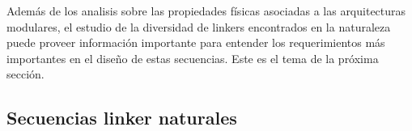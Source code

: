 Además de los analisis sobre las propiedades físicas asociadas a las arquitecturas modulares, el estudio de la diversidad de linkers encontrados en la naturaleza puede proveer información importante para entender los requerimientos
más importantes en el diseño de estas secuencias.
Este es el tema de la próxima sección.






























\subsection{Secuencias linker naturales}


